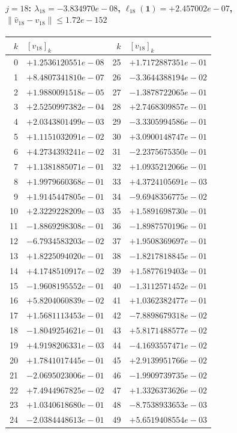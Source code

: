 \documentclass[11pt]{article}
\begin{document}
\paragraph{$j = 18$: $\lambda_{18} = -3.834970e-08$, \quad $\ell_{18}(\mathbf{1}) = +2.457002e-07$, \quad $\|\hat v_{18} - v_{18}\| \leq 1.72e-152$}
\begin{center}
{\footnotesize
\begin{tabular}{r@{\;\;}l@{\quad}r@{\;\;}l}
\toprule
$k$ & $[v_{18}]_k$ & $k$ & $[v_{18}]_k$ \\
\midrule
0 & $+1.2536120551e-08$ & 25 & $+1.7172887351e-01$ \\
1 & $+8.4807341810e-07$ & 26 & $-3.3644388194e-02$ \\
2 & $+1.9880091518e-05$ & 27 & $-1.3878722065e-01$ \\
3 & $+2.5250997382e-04$ & 28 & $+2.7468309857e-01$ \\
4 & $+2.0343801499e-03$ & 29 & $-3.3305994586e-01$ \\
5 & $+1.1151032091e-02$ & 30 & $+3.0900148747e-01$ \\
6 & $+4.2734393241e-02$ & 31 & $-2.2375675350e-01$ \\
7 & $+1.1381885071e-01$ & 32 & $+1.0935212066e-01$ \\
8 & $+1.9979660368e-01$ & 33 & $+4.3724105691e-03$ \\
9 & $+1.9145447805e-01$ & 34 & $-9.6948356775e-02$ \\
10 & $+2.3229228209e-03$ & 35 & $+1.5891698730e-01$ \\
11 & $-1.8869298308e-01$ & 36 & $-1.8987570196e-01$ \\
12 & $-6.7934583203e-02$ & 37 & $+1.9508369697e-01$ \\
13 & $+1.8225094020e-01$ & 38 & $-1.8217818845e-01$ \\
14 & $+4.1748510917e-02$ & 39 & $+1.5877619403e-01$ \\
15 & $-1.9608195552e-01$ & 40 & $-1.3112571452e-01$ \\
16 & $+5.8204060839e-02$ & 41 & $+1.0362382477e-01$ \\
17 & $+1.5681113453e-01$ & 42 & $-7.8898679318e-02$ \\
18 & $-1.8049254621e-01$ & 43 & $+5.8171488577e-02$ \\
19 & $+4.9198206331e-03$ & 44 & $-4.1693557471e-02$ \\
20 & $+1.7841017445e-01$ & 45 & $+2.9139951766e-02$ \\
21 & $-2.0695023006e-01$ & 46 & $-1.9909739735e-02$ \\
22 & $+7.4944967825e-02$ & 47 & $+1.3326373626e-02$ \\
23 & $+1.0340618680e-01$ & 48 & $-8.7538933653e-03$ \\
24 & $-2.0384448613e-01$ & 49 & $+5.6519408554e-03$ \\
\bottomrule
\end{tabular}
}
\end{center}
\end{document}
